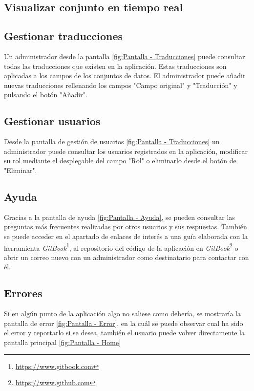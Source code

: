 \subsection{Visualizar conjunto en tiempo real}\label{visualizar-conjunto}



\subsection{Gestionar traducciones}\label{gestión-traducciones}
Un administrador desde la pantalla \ref{fig:Pantalla - Traducciones} puede consultar todas las traducciones que existen en la aplicación. Estas traducciones son aplicadas a los campos de los conjuntos de datos.
El administrador puede añadir nuevas traducciones rellenando los campos "Campo original" y "Traducción" y pulsando el botón "Añadir".

\subsection{Gestionar usuarios}\label{gestión-usuarios}
Desde la pantalla de gestión de usuarios \ref{fig:Pantalla - Traducciones} un administrador puede consultar los usuarios registrados en la aplicación, modificar su rol mediante el desplegable del campo "Rol" o eliminarlo desde el botón de "Eliminar".

\subsection{Ayuda}\label{consulta-ayuda}
Gracias a la pantalla de ayuda \ref{fig:Pantalla - Ayuda}, se pueden consultar las preguntas más frecuentes realizadas por otros usuarios y sus respuestas. También se puede acceder en el apartado de enlaces de interés a una guía elaborada con la herramienta \textit{GitBook}\footnote{\url{https://www.gitbook.com}}, al repositorio del código de la aplicación en \textit{GitBook}\footnote{\url{https://www.github.com}} o abrir un correo nuevo con un administrador como destinatario para contactar con él.

\subsection{Errores}\label{errores}
Si en algún punto de la aplicación algo no saliese como debería, se mostraría la pantalla de error \ref{fig:Pantalla - Error}, en la cuál se puede observar cual ha sido el error y reportarlo si se desea, también el usuario puede volver directamente la pantalla principal \ref{fig:Pantalla - Home}
